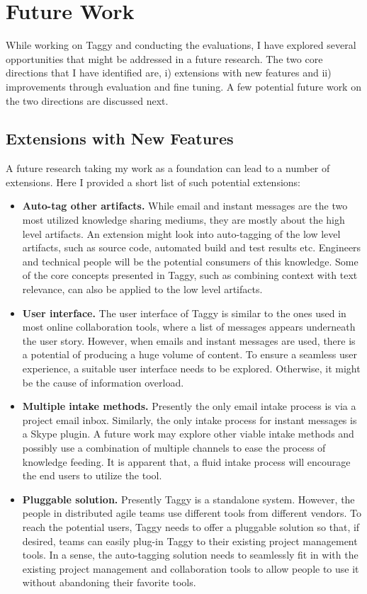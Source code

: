 \section{Future Work}
While working on Taggy and conducting the evaluations, I have explored several opportunities that might be addressed in a future research. The two core directions that I have identified are, i) extensions with new features and ii) improvements through evaluation and fine tuning. A few potential future work on the two directions are discussed next.

\subsection{Extensions with New Features}
A future research taking my work as a foundation can lead to a number of extensions. Here I provided a short list of such potential extensions:

\begin{itemize}
	\item \textbf{Auto-tag other artifacts.} While email and instant messages are the two most utilized knowledge sharing mediums, they are mostly about the high level artifacts. An extension might look into auto-tagging of the low level artifacts, such as source code, automated build and test results etc. Engineers and technical people will be the potential consumers of this knowledge. Some of the core concepts presented in Taggy, such as combining context with text relevance, can also be applied to the low level artifacts.
	
	\item \textbf{User interface.} The user interface of Taggy is similar to the ones used in most online collaboration tools, where a list of messages appears underneath the user story. However, when emails and instant messages are used, there is a potential of producing a huge volume of content. To ensure a seamless user experience, a suitable user interface needs to be explored. Otherwise, it might be the cause of information overload.
	
	\item \textbf{Multiple intake methods.} Presently the only email intake process is via a project email inbox. Similarly, the only intake process for instant messages is a Skype plugin. A future work may explore other viable intake methods and possibly use a combination of multiple channels to ease the process of knowledge feeding. It is apparent that, a fluid intake process will encourage the end users to utilize the tool.
	
	\item \textbf{Pluggable solution.} Presently Taggy is a standalone system. However, the people in distributed agile teams use different tools from different vendors. To reach the potential users, Taggy needs to offer a pluggable solution so that, if desired, teams can easily plug-in Taggy to their existing project management tools. In a sense, the auto-tagging solution needs to seamlessly fit in with the existing project management and collaboration tools to allow people to use it without abandoning their favorite tools.
\end{itemize}		
	
